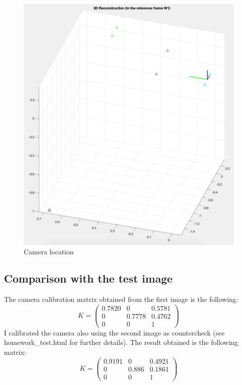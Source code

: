 \documentclass{article}
\begin{document}
\begin{figure}[hbt!]
\centering
\includegraphics[scale=0.25]{images/cameralocation.png}
\caption{Camera location}
\label{fig:cameralocation}
\end{figure}

\subsection{Comparison with the test image}
The camera calibration matrix obtained from the first image is the following:
$$ K = \begin{pmatrix}
0.7820 & 0 & 0.5781 \\
0 & 0.7778 & 0.4762 \\
0 & 0 & 1
\end{pmatrix} $$
I calibrated the camera also using the second image as countercheck (see homework\_test.html for further details). The result obtained is the following matrix:
$$ K = \begin{pmatrix}
0.9191 & 0 & 0.4921 \\
0 & 0.886 & 0.1861 \\
0 & 0 & 1
\end{pmatrix} $$

\newpage


\end{document}
